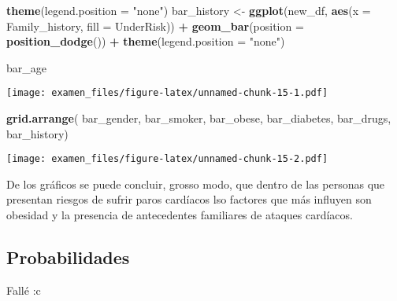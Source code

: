 \documentclass[
  10pt,
  spanish,
]{article}
\newenvironment{Shaded}{\begin{snugshade}}{\end{snugshade}}
\newcommand{\DataTypeTok}[1]{\textcolor[rgb]{0.13,0.29,0.53}{#1}}
\newcommand{\KeywordTok}[1]{\textcolor[rgb]{0.13,0.29,0.53}{\textbf{#1}}}
\newcommand{\NormalTok}[1]{#1}
\newcommand{\OperatorTok}[1]{\textcolor[rgb]{0.81,0.36,0.00}{\textbf{#1}}}
\newcommand{\StringTok}[1]{\textcolor[rgb]{0.31,0.60,0.02}{#1}}
\begin{document}
\begin{Shaded}
\begin{Highlighting}[]
\StringTok{    }\KeywordTok{theme}\NormalTok{(}\DataTypeTok{legend.position =} \StringTok{"none"}\NormalTok{)}
\NormalTok{bar\_history \textless{}{-}}\StringTok{ }\KeywordTok{ggplot}\NormalTok{(new\_df, }\KeywordTok{aes}\NormalTok{(}\DataTypeTok{x =}\NormalTok{ Family\_history, }\DataTypeTok{fill =}\NormalTok{ UnderRisk)) }\OperatorTok{+}
\StringTok{    }\KeywordTok{geom\_bar}\NormalTok{(}\DataTypeTok{position =} \KeywordTok{position\_dodge}\NormalTok{()) }\OperatorTok{+}
\StringTok{    }\KeywordTok{theme}\NormalTok{(}\DataTypeTok{legend.position =} \StringTok{"none"}\NormalTok{)}

\NormalTok{bar\_age}
\end{Highlighting}
\end{Shaded}

\texttt{[image: examen\_files/figure-latex/unnamed-chunk-15-1.pdf]}

\begin{Shaded}
\begin{Highlighting}[]
\KeywordTok{grid.arrange}\NormalTok{(}
\NormalTok{    bar\_gender,}
\NormalTok{    bar\_smoker,}
\NormalTok{    bar\_obese,}
\NormalTok{    bar\_diabetes,}
\NormalTok{    bar\_drugs,}
\NormalTok{    bar\_history)}
\end{Highlighting}
\end{Shaded}

\texttt{[image: examen\_files/figure-latex/unnamed-chunk-15-2.pdf]}

De los gráficos se puede concluir, grosso modo, que dentro de las
personas que presentan riesgos de sufrir paros cardíacos lso factores
que más influyen son obesidad y la presencia de antecedentes familiares
de ataques cardíacos.

\hypertarget{probabilidades}{%
\subsection{Probabilidades}\label{probabilidades}}

Fallé :c
\end{document}
